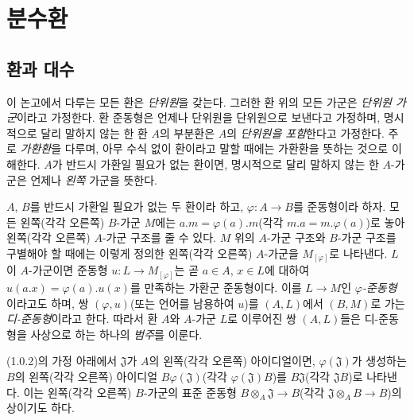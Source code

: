 \section{분수환}
\label{section:0.1-ko}

\setcounter{subsection}{-1}
\subsection{환과 대수}
\label{subsection:0.1.0-ko}

\begin{env}[1.0.1]
\label{0.1.0.1-ko}
이 논고에서 다루는 모든 환은 \emph{단위원}을 갖는다.
그러한 환 위의 모든 가군은 \emph{단위원 가군}이라고 가정한다. 환 준동형은 언제나 단위원을 단위원으로 보낸다고 가정하며, 명시적으로 달리 말하지 않는 한 환 $A$의 부분환은 $A$의 \emph{단위원을 포함}한다고 가정한다.
주로 \emph{가환환}을 다루며, 아무 수식 없이 환이라고 말할 때에는 가환환을 뜻하는 것으로 이해한다.
$A$가 반드시 가환일 필요가 없는 환이면, 명시적으로 달리 말하지 않는 한 $A$-가군은 언제나 \emph{왼쪽} 가군을 뜻한다.
\end{env}

\begin{env}[1.0.2]
\label{0.1.0.2-ko}
$A$, $B$를 반드시 가환일 필요가 없는 두 환이라 하고, $\varphi:A\to B$를 준동형이라 하자.
모든 왼쪽(각각 오른쪽) $B$-가군 $M$에는 $a.m=\varphi(a).m$(각각 $m.a=m.\varphi(a)$)로 놓아 왼쪽(각각 오른쪽) $A$-가군 구조를 줄 수 있다. $M$ 위의 $A$-가군 구조와 $B$-가군 구조를 구별해야 할 때에는 이렇게 정의한 왼쪽(각각 오른쪽) $A$-가군을 $M_{[\varphi]}$로 나타낸다.
$L$이 $A$-가군이면 준동형 $u:L\to M_{[\varphi]}$는 곧 $a\in A$, $x\in L$에 대하여 $u(a.x)=\varphi(a).u(x)$를 만족하는 가환군 준동형이다. 이를 $L\to M$인 \emph{$\varphi$-준동형}이라고도 하며, 쌍 $(\varphi,u)$(또는 언어를 남용하여 $u$)를 $(A,L)$에서 $(B,M)$로 가는 \emph{디-준동형}이라고 한다.
따라서 환 $A$와 $A$-가군 $L$로 이루어진 쌍 $(A,L)$들은 디-준동형을 사상으로 하는 하나의 \emph{범주}를 이룬다.
\end{env}

\begin{env}[1.0.3]
\label{0.1.0.3-ko}
(1.0.2)의 가정 아래에서 $\mathfrak{J}$가 $A$의 왼쪽(각각 오른쪽) 아이디얼이면, $\varphi(\mathfrak{J})$가 생성하는 $B$의 왼쪽(각각 오른쪽) 아이디얼 $B\varphi(\mathfrak{J})$(각각 $\varphi(\mathfrak{J})B$)를 $B\mathfrak{J}$(각각 $\mathfrak{J}B$)로 나타낸다. 이는 왼쪽(각각 오른쪽) $B$-가군의 표준 준동형 $B\otimes_A\mathfrak{J}\to B$(각각 $\mathfrak{J}\otimes_A B\to B$)의 상이기도 하다.
\end{env}

